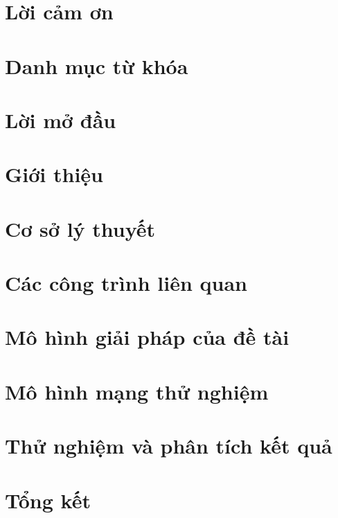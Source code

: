\documentclass[a4paper,oneside]{report}
\begin{document}



\chapter*{Lời cảm ơn}


\tableofcontents

\chapter*{Danh mục từ khóa}


\listoffigures

\listoftables

\chapter*{Lời mở đầu}
\label{chap:foreword}


\chapter{Giới thiệu}
\label{chap:introduction}


\chapter{Cơ sở lý thuyết}
\label{chap:background}


\chapter{Các công trình liên quan}
\label{chap:review}


\chapter{Mô hình giải pháp của đề tài}
\label{chap:method}


\chapter{Mô hình mạng thử nghiệm}
\label{chap:network_model}


\chapter{Thử nghiệm và phân tích kết quả}
\label{chap:testing}



\chapter{Tổng kết}
\label{chap:conclusion}


{}

\end{document}
